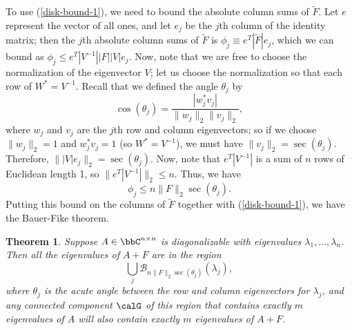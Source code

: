 \documentclass[12pt, leqno]{article} %
\newcommand{\calB}{\mathcal{B}}
\newtheorem{theorem}{Theorem}
\begin{document}
To use (\ref{disk-bound-1}), we need to bound
the absolute column sums of $\tilde{F}$.  Let $e$ represent
the vector of all ones, and let $e_j$ be the $j$th column of
the identity matrix; then the $j$th absolute column sums of $\tilde{F}$
is $\phi_j \equiv e^T |\tilde{F}| e_j$, which we can bound
as $\phi_j \leq e^T |V^{-1}| |F| |V| e_j$.  Now, note that we
are free to choose the normalization of the eigenvector $V$;
let us choose the normalization so that each row of $W^* = V^{-1}$.
Recall that we defined the angle $\theta_j$ by
\[
  \cos(\theta_j) = \frac{|w_j^* v_j|}{\|w_j\|_2 \|v_j\|_2},
\]
where $w_j$ and $v_j$ are the $j$th row and column eigenvectors;
so if we choose $\|w_j\|_2 = 1$ and $w_j^* v_j = 1$ (so $W^* = V^{-1}$),
we must have $\|v_j\|_2 = \sec(\theta_j)$.  Therefore,
$\||V| e_j\|_2 = \sec(\theta_j)$.  Now, note that $e^T |V^{-1}|$ is
a sum of $n$ rows of Euclidean length 1, so $\|e^T |V^{-1}|\|_2 \leq n$.
Thus, we have
\[
  \phi_j \leq n \|F\|_2 \sec(\theta_j).
\]
Putting this bound on the columns of $\tilde{F}$ together with
(\ref{disk-bound-1}), we have the Bauer-Fike theorem.

\begin{theorem}
  Suppose $A \in \bbC^{n \times n}$ is diagonalizable with
  eigenvalues $\lambda_1, \ldots, \lambda_n$.
  Then all the eigenvalues of $A+F$ are in the region
  \[
    \bigcup_j \calB_{n \|F\|_2 \sec(\theta_j)}(\lambda_j),
  \]
  where $\theta_j$ is the acute angle between the row and column eigenvectors
  for $\lambda_j$, and any connected component $\calG$ of this region that
  contains exactly $m$ eigenvalues of $A$ will also contain exactly $m$
  eigenvalues of $A+F$.
\end{theorem}
\end{document}
